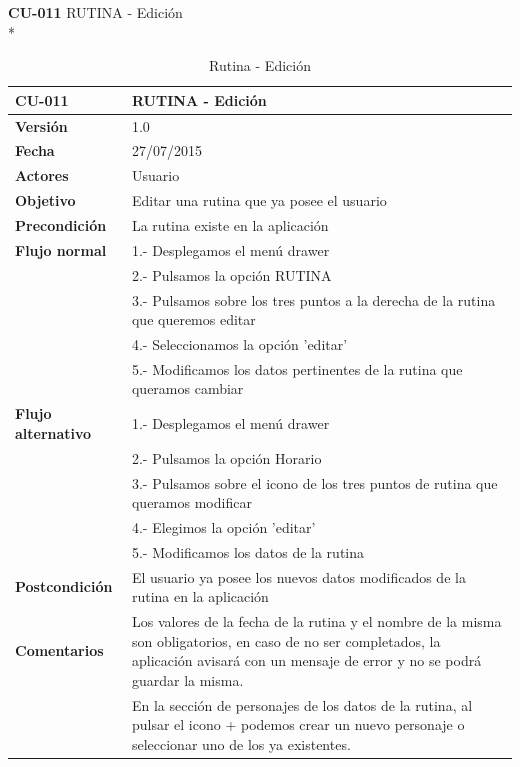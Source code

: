 \documentclass[../pfc.tex]{subfiles}
\begin{document}
	\clearpage
		
	\textbf{CU-011}	RUTINA - Edición\\*
		
		\begin{table}[H]
			\centering
			\begin{tabular}[t]{|p{3cm}|p{9.5cm}|}
				\hline \textbf{CU-011} & \textbf{RUTINA - Edición} \\*
				\hline\hline \textbf{Versión} & 1.0 \\*
				\hline\hline \textbf{Fecha} & 27/07/2015 \\*
				\hline\textbf{Actores} 	& Usuario\\*
				\hline \textbf{Objetivo} & Editar una rutina que ya posee el usuario\\* 			
				\hline \textbf{Precondición} & La rutina existe en la aplicación\\* 
				\hline \textbf{Flujo normal} & 1.- Desplegamos el menú drawer \\* 
				& 2.- Pulsamos la opción RUTINA\\*	
				& 3.- Pulsamos sobre los tres puntos a la derecha de la rutina que queremos editar\\*	
				& 4.- Seleccionamos la opción 'editar'\\*	
				& 5.- Modificamos los datos pertinentes de la rutina que queramos cambiar\\*	
				\hline \textbf{Flujo alternativo} & 1.- Desplegamos el menú drawer \\* 
				& 2.- Pulsamos la opción Horario \\*	
				& 3.- Pulsamos sobre el icono de los tres puntos de rutina que queramos modificar \\*	
				& 4.- Elegimos la opción 'editar'\\*	
				& 5.- Modificamos los datos de la rutina\\*	
				\hline \textbf{Postcondición} & El usuario ya posee los nuevos datos modificados de la rutina en la aplicación \\* 
				\hline \textbf{Comentarios}   & Los valores de la fecha de la rutina y el nombre de la misma son obligatorios, en caso de no ser completados, la aplicación avisará con un mensaje de error y no se podrá guardar la misma.\\*
				& En la sección de personajes de los datos de la rutina, al pulsar el icono + podemos crear un nuevo personaje o seleccionar uno de los ya existentes.\\*
				\hline
			\end{tabular}
			\caption{Rutina - Edición}
			\label{tabla:caso011}
		\end{table}
	
\end{document}
